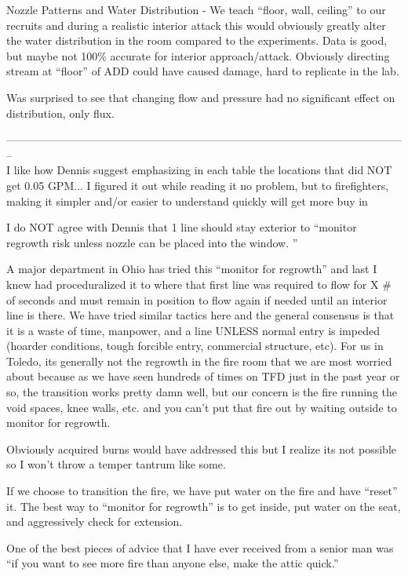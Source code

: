 \documentclass[12pt,oneside]{book}
\begin{document}
\begin{appendix}
Nozzle Patterns and Water Distribution - We teach ``floor, wall, ceiling'' to our recruits and during a realistic interior attack this would obviously greatly alter the water distribution in the room compared to the experiments.  Data is good, but maybe not 100\% accurate for interior approach/attack. Obviously directing stream at ``floor'' of ADD could have caused damage, hard to replicate in the lab. 

Was surprised to see that changing flow and pressure had no significant effect on distribution, only flux. 

-------------------------------------------------------------------------------------------------------------- \\

I like how Dennis suggest emphasizing in each table the locations that did NOT get 0.05 GPM... I figured it out while reading it no problem, but to firefighters, making it simpler and/or easier to understand quickly will get more buy in

I do NOT agree with Dennis that 1 line should stay exterior to ``monitor regrowth risk unless nozzle can be placed into the window.  ''

A major department in Ohio has tried this ``monitor for regrowth'' and last I knew had proceduralized it to where that first line was required to flow for X \# of seconds and must remain in position to flow again if needed until an interior line is there.  We have tried similar tactics here and the general consensus is that it is a waste of time, manpower, and a line UNLESS normal entry is impeded (hoarder conditions, tough forcible entry, commercial structure, etc).  For us in Toledo, its generally not the regrowth in the fire room that we are most worried about because as we have seen hundreds of times on TFD just in the past year or so, the transition works pretty damn well, but our concern is the fire running the void spaces, knee walls, etc. and you can't put that fire out by waiting outside to monitor for regrowth.

Obviously acquired burns would have addressed this but I realize its not possible so I won't throw a temper tantrum like some.

If we choose to transition the fire, we have put water on the fire and have ``reset'' it.  The best way to ``monitor for regrowth'' is to get inside, put water on the seat, and aggressively check for extension.  

One of the best pieces of advice that I have ever received from a senior man was ``if you want to see more fire than anyone else, make the attic quick.''  


\end{appendix}
\end{document}
